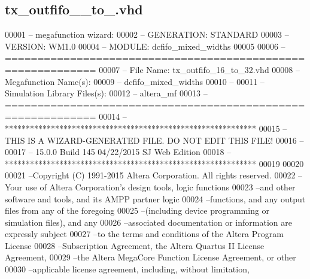 \subsection{tx\+\_\+outfifo\+\_\+\_\+to\+\_.\+vhd}
\label{tx__outfifo__16__to__32_8vhd_source}

\begin{DoxyCode}
00001 \textcolor{keyword}{-- megafunction wizard: %
00002 \textcolor{keyword}{-- GENERATION: STANDARD}
00003 \textcolor{keyword}{-- VERSION: WM1.0}
00004 \textcolor{keyword}{-- MODULE: dcfifo\_mixed\_widths }
00005 
00006 \textcolor{keyword}{-- ============================================================}
00007 \textcolor{keyword}{-- File Name: tx\_outfifo\_16\_to\_32.vhd}
00008 \textcolor{keyword}{-- Megafunction Name(s):}
00009 \textcolor{keyword}{--          dcfifo\_mixed\_widths}
00010 \textcolor{keyword}{--}
00011 \textcolor{keyword}{-- Simulation Library Files(s):}
00012 \textcolor{keyword}{--          altera\_mf}
00013 \textcolor{keyword}{-- ============================================================}
00014 \textcolor{keyword}{-- ************************************************************}
00015 \textcolor{keyword}{-- THIS IS A WIZARD-GENERATED FILE. DO NOT EDIT THIS FILE!}
00016 \textcolor{keyword}{--}
00017 \textcolor{keyword}{-- 15.0.0 Build 145 04/22/2015 SJ Web Edition}
00018 \textcolor{keyword}{-- ************************************************************}
00019 
00020 
00021 \textcolor{keyword}{--Copyright (C) 1991-2015 Altera Corporation. All rights reserved.}
00022 \textcolor{keyword}{--Your use of Altera Corporation's design tools, logic functions }
00023 \textcolor{keyword}{--and other software and tools, and its AMPP partner logic }
00024 \textcolor{keyword}{--functions, and any output files from any of the foregoing }
00025 \textcolor{keyword}{--(including device programming or simulation files), and any }
00026 \textcolor{keyword}{--associated documentation or information are expressly subject }
00027 \textcolor{keyword}{--to the terms and conditions of the Altera Program License }
00028 \textcolor{keyword}{--Subscription Agreement, the Altera Quartus II License Agreement,}
00029 \textcolor{keyword}{--the Altera MegaCore Function License Agreement, or other }
00030 \textcolor{keyword}{--applicable license agreement, including, without limitation, }
}
\end{DoxyCode}
